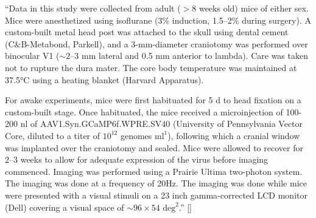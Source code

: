 \documentclass[MTech]{iitmdiss}
\begin{document}
``Data in this study were collected from adult ($> 8$ weeks old) mice of either sex. Mice were anesthetized using isoflurane (3\% induction, 1.5–2\% during surgery). A custom-built metal head post was attached to the skull using dental cement (C\&B-Metabond, Parkell), and a 3-mm-diameter craniotomy was performed over binocular V1 ($\sim 2–3$ mm lateral and 0.5 mm anterior to lambda). Care was taken not to rupture the dura mater. The core body temperature was maintained at 37.5°C using a heating blanket (Harvard Apparatus).

For awake experiments, mice were first habituated for 5 d to head fixation on a custom-built stage. Once habituated, the mice received a microinjection of 100-200 nl of AAV1.Syn.GCaMP6f.WPRE.SV40 (University of Pennsylvania Vector Core, diluted to a titer of $10^{12}$ genomes $\text{ml}^1$), following which a cranial window was implanted over the
craniotomy and sealed. Mice were allowed to recover for 2–3 weeks to allow for adequate expression of the virus before imaging commenced. Imaging was performed using a Prairie Ultima two-photon system. The imaging was done at a frequency of 20Hz. The imaging was done while mice were presented with a visual stimuli on a 23 inch gamma-corrected LCD monitor (Dell) covering a visual space of $\sim 96 \times 54 \text{ deg}^2$.'' [\cite{rikhye2015spatial}]
\end{document}
